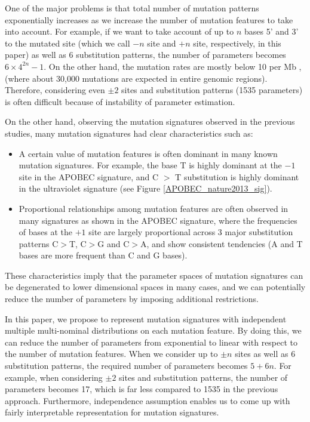 One of the major problems is that 
total number of mutation patterns exponentially increases
as we increase the number of mutation features to take into account.
For example, if we want to take account of up to $n$ bases 5' and 3' to the mutated site 
(which we call $-n$ site and $+n$ site, respectively, in this paper) as well as 6 substitution patterns, 
the number of parameters becomes $6 \times 4^{2n} - 1$. 
On the other hand, the mutation rates are mostly below 10 per Mb \cite{pmid23945592},
(where about 30,000 mutations are expected in entire genomic regions).
Therefore, considering even $\pm 2$ sites and substitution patterns (1535 parameters)
is often difficult because of instability of parameter estimation. 


On the other hand, observing the mutation signatures observed in the previous studies, 
many mutation signatures had clear characteristics such as:
\begin{itemize}
\item 
A certain value of mutation features is often dominant in many known mutation signatures. 
For example, the base T is highly dominant at the $-1$ site in the APOBEC signature, 
and C $>$ T substitution is highly dominant in the ultraviolet signature \cite{pmid23945592} (see Figure \ref{APOBEC_nature2013_sig}). 

\item
Proportional relationships among mutation features are often observed in many signatures as shown in the APOBEC signature, 
where the frequencies of bases at the $+1$ site are largely proportional across 3 major substitution patterns C$>$T, C$>$G and C$>$A,
and show consistent tendencies (A and T bases are more frequent than C and G bases).

\end{itemize} 

These characteristics imply that the parameter spaces of mutation signatures can be degenerated to lower dimensional spaces in many cases, 
and we can potentially reduce the number of parameters by imposing additional restrictions. 

In this paper, we propose to represent mutation signatures with independent multiple multi-nominal distributions
on each mutation feature. 
By doing this, we can reduce the number of parameters from exponential to linear with respect to the number of mutation features. 
When we consider up to $\pm n$ sites as well as 6 substitution patterns, 
the required number of parameters becomes $5 + 6n$. 
For example, when considering $\pm 2$ sites and substitution patterns,
the number of parameters becomes 17, which is far less compared to 1535 in the previous approach.
Furthermore, independence assumption enables us to come up with fairly interpretable representation for mutation signatures.


